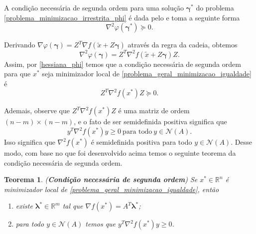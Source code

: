 \documentclass[12pt,a4paper]{scrartcl}
\def\RR{\mathds{R}}
\newtheorem{teo}{Teorema}
\theoremstyle{definition}%
\begin{document}
A condição necessária de segunda ordem para uma solução $\boldsymbol{\gamma}^{*}$ do problema \eqref{problema_minimizacao_irrestrita_phi} é dada pelo  e toma a seguinte forma
\[ \label{hessiana_phi}
\nabla^{2} \varphi (\boldsymbol{\gamma}^{*}) \succcurlyeq 0.
\]

Derivando $\nabla \varphi (\boldsymbol{\gamma}) = Z^{T}\nabla f(\tilde{x} + Z\boldsymbol{\gamma})$ através da regra da cadeia, obtemos
\[
\nabla^{2} \varphi(\boldsymbol{\gamma}) = Z^{T} \nabla^{2} f(\tilde{x} + Z\boldsymbol{\gamma})Z .
\]
Assim, por \eqref{hessiana_phi} temos que a condição necessária de segunda ordem para que $x^{*}$ seja minimizador local de \eqref{problema_geral_minimizacao_igualdade} é
\[
Z^{T} \nabla^{2} f(x^{*})Z \succcurlyeq 0.
\]

Ademais, observe que $Z^{T}\nabla^{2} f(x^{*})Z$ é uma matriz de ordem $(n-m)\times (n-m)$, e o fato de ser semidefinida positiva significa que
\[
y^{T}\nabla^{2} f(x^{*})y \geq 0 \ \text{para todo} \ y \in \mathcal{N}(A) .
\]
Isso significa que $\nabla^{2} f(x^{*})$ é semidefinida positiva para todo $y\in \mathcal{N}(A)$. Desse modo, com base no que foi desenvolvido acima temos o seguinte teorema da condição necessária de segunda ordem.

\begin{teo}(\textbf{Condição necessária de segunda ordem}) \label{teo:condicao_necessaria_2ordem_igualdade}
Se $x^{*} \in \RR^{n}$ é minimizador local de \eqref{problema_geral_minimizacao_igualdade}, então  
\begin{enumerate}
	\item[(i)] existe $\boldsymbol{\lambda}^{*} \in \RR^{m}$ tal que $\nabla f(x^{*}) = A^{T} \boldsymbol{\lambda}^{*}$;
	\item[(ii)] para todo $y \in \mathcal{N}(A)$ temos que $y^{T}\nabla^{2} f(x^{*})y \geq 0$.
\end{enumerate}
\end{teo}
\end{document}
